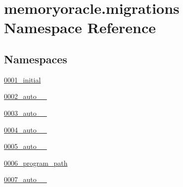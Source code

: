 \hypertarget{namespacememoryoracle_1_1migrations}{}\section{memoryoracle.\+migrations Namespace Reference}
\label{namespacememoryoracle_1_1migrations}
\subsection*{Namespaces}
\begin{DoxyCompactItemize}
\item 
 \hyperlink{namespacememoryoracle_1_1migrations_1_10001__initial}{0001\+\_\+initial}
\item 
 \hyperlink{namespacememoryoracle_1_1migrations_1_10002__auto__20150402__2000}{0002\+\_\+auto\+\_\+\_}
\item 
 \hyperlink{namespacememoryoracle_1_1migrations_1_10003__auto__20150402__2000}{0003\+\_\+auto\+\_\+\_}
\item 
 \hyperlink{namespacememoryoracle_1_1migrations_1_10004__auto__20150402__2000}{0004\+\_\+auto\+\_\+\_}
\item 
 \hyperlink{namespacememoryoracle_1_1migrations_1_10005__auto__20150403__0100}{0005\+\_\+auto\+\_\+\_}
\item 
 \hyperlink{namespacememoryoracle_1_1migrations_1_10006__program__path}{0006\+\_\+program\+\_\+path}
\item 
 \hyperlink{namespacememoryoracle_1_1migrations_1_10007__auto__20150403__0248}{0007\+\_\+auto\+\_\+\_}
\end{DoxyCompactItemize}
